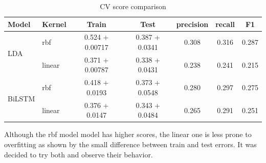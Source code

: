 \documentclass[11pt]{article}
\begin{document}

\begin{table}[htb]
\begin{center}
\begin{tabular}{ |p{1.5cm}|p{1cm}|c|c|c|c|c| }
\hline
Model 	& Kernel 	& Train & Test & precision & recall & F1 \\ \hline
\multirow{2}{*}{LDA} &	rbf		& 0.524 + 0.00717 & 0.387 + 0.0341 & 0.308 & 0.316 & 0.287 \\ 
& linear	& 0.371 + 0.00787 & 0.338 + 0.0431 & 0.238 & 0.241 & 0.215 \\ \hline
\multirow{2}{*}{BiLSTM}&	rbf		& 0.418 + 0.0193 & 0.373 + 0.0548 & 0.280 & 0.297 & 0.275 \\ 
& linear	& 0.376 + 0.0147 & 0.343 + 0.0484 & 0.265 & 0.291 & 0.251 \\ \hline
\end{tabular}
\caption{CV score comparison} \label{tab:classificationresults}
\end{center}
\end{table}
\FloatBarrier

Although the rbf model model has higher scores, the linear one is less prone to overfitting as shown by the small difference between train and test errors. It was decided to try both and observe their behavior.
\end{document}
